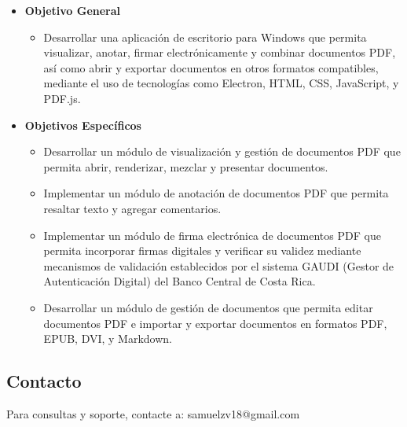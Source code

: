 



\begin{itemize}
    \item \textbf{Objetivo General}
    \begin{itemize}
        \item Desarrollar una aplicación de escritorio para Windows que permita visualizar, anotar, firmar electrónicamente y combinar documentos PDF, así como abrir y exportar documentos en otros formatos compatibles, mediante el uso de tecnologías como Electron, HTML, CSS, JavaScript, y PDF.js.
    \end{itemize}
    \item \textbf{Objetivos Específicos}
    \begin{itemize}
        \item Desarrollar un módulo de visualización y gestión de documentos PDF que permita abrir, renderizar, mezclar y presentar documentos.
        \item Implementar un módulo de anotación de documentos PDF que permita resaltar texto y agregar comentarios.
        \item Implementar un módulo de firma electrónica de documentos PDF que permita incorporar firmas digitales y verificar su validez mediante mecanismos de validación establecidos por el sistema GAUDI (Gestor de Autenticación Digital) del Banco Central de Costa Rica.
        \item Desarrollar un módulo de gestión de documentos que permita editar documentos PDF e importar y exportar documentos en formatos PDF, EPUB, DVI, y Markdown.
        
    \end{itemize}
\end{itemize}

\subsection{Contacto}
Para consultas y soporte, contacte a: samuelzv18@gmail.com


